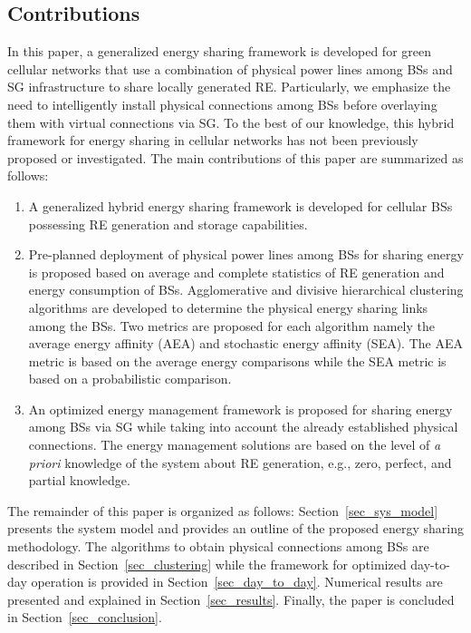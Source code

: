 \documentclass[10pt, letter,twocolumn]{IEEEtran}
\begin{document}
\subsection{Contributions}
In this paper, a generalized energy sharing framework is developed for green cellular networks that use a combination of physical power lines among BSs and SG infrastructure to share locally generated RE. Particularly, we emphasize the need to intelligently install physical connections among BSs before overlaying them with virtual connections via SG. To the best of our knowledge, this hybrid framework for energy sharing in cellular networks has not been previously proposed or investigated. The main contributions of this paper are summarized as follows:
\begin{enumerate}
  \item A generalized hybrid energy sharing framework is developed for cellular BSs possessing RE generation and storage capabilities.
  \item Pre-planned deployment of physical power lines among BSs for sharing energy is proposed based on average and complete statistics of RE generation and energy consumption of BSs. Agglomerative and divisive hierarchical clustering algorithms are developed to determine the physical energy sharing links among the BSs. Two metrics are proposed for each algorithm namely the average energy affinity (AEA) and stochastic energy affinity (SEA). The AEA metric is based on the average energy comparisons while the SEA metric is based on a probabilistic comparison.
  \item An optimized energy management framework is proposed for sharing energy among BSs via SG while taking into account the already established physical connections. The energy management solutions are based on the level of \emph{a priori} knowledge of the system about RE generation, e.g., zero, perfect, and partial knowledge.
\end{enumerate}

The remainder of this paper is organized as follows: Section~\ref{sec_sys_model} presents the system model and provides an outline of the proposed energy sharing methodology. The algorithms to obtain physical connections among BSs are described in Section~\ref{sec_clustering} while the framework for optimized day-to-day operation is provided in Section~\ref{sec_day_to_day}. Numerical results are presented and explained in Section~\ref{sec_results}. Finally, the paper is concluded in Section~\ref{sec_conclusion}.
\vspace{-0.0cm}
\end{document}
